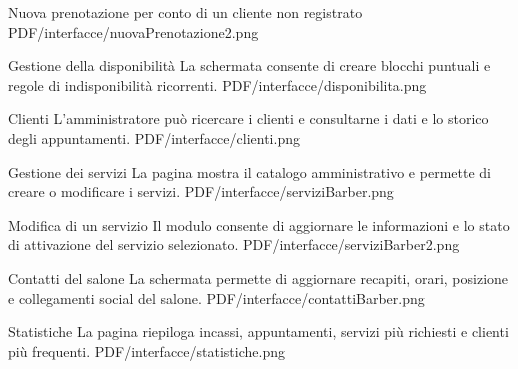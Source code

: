 \documentclass[12pt,a4paper]{article}
\begin{document}
\schermata
    {Nuova prenotazione per conto di un cliente non registrato}
    {}
    {PDF/interfacce/nuovaPrenotazione2.png}

\schermata
    {Gestione della disponibilità}
    {La schermata consente di creare blocchi puntuali e regole di
    indisponibilità ricorrenti.}
    {PDF/interfacce/disponibilita.png}

\schermata
    {Clienti}
    {L'amministratore può ricercare i clienti e consultarne i dati e lo
    storico degli appuntamenti.}
    {PDF/interfacce/clienti.png}

\schermata
    {Gestione dei servizi}
    {La pagina mostra il catalogo amministrativo e permette di creare o
    modificare i servizi.}
    {PDF/interfacce/serviziBarber.png}

\schermata
    {Modifica di un servizio}
    {Il modulo consente di aggiornare le informazioni e lo stato di
    attivazione del servizio selezionato.}
    {PDF/interfacce/serviziBarber2.png}

\schermata
    {Contatti del salone}
    {La schermata permette di aggiornare recapiti, orari, posizione e
    collegamenti social del salone.}
    {PDF/interfacce/contattiBarber.png}

\schermata
    {Statistiche}
    {La pagina riepiloga incassi, appuntamenti, servizi più richiesti e
    clienti più frequenti.}
    {PDF/interfacce/statistiche.png}
\end{document}
